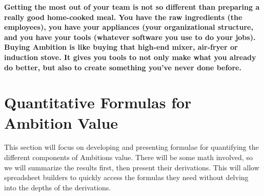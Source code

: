 \documentclass[paper=a4, fontsize=11pt abstract]{scrartcl}
\numberwithin{equation}{section}		%
\numberwithin{figure}{section}			%
\numberwithin{table}{section}				%
\begin{document}
\textbf{Getting the most out of your team is not so different than preparing a really good home-cooked meal. You have the raw ingredients (the employees), you have your appliances (your organizational structure, and you have your tools (whatever software you use to do your jobs).  Buying Ambition is like buying that high-end mixer, air-fryer or induction stove.  It gives you tools to not only make what you already do better, but also to create something you've never done before.}


\section{Quantitative Formulas for Ambition Value}
This section will focus on developing and presenting formulae for quantifying the different components of Ambitions value.  There will be some math involved, so we will summarize the results first, then present their derivations.  This will allow spreadsheet builders to quickly access the formulas they need without delving into the depths of the derivations.
\end{document}
